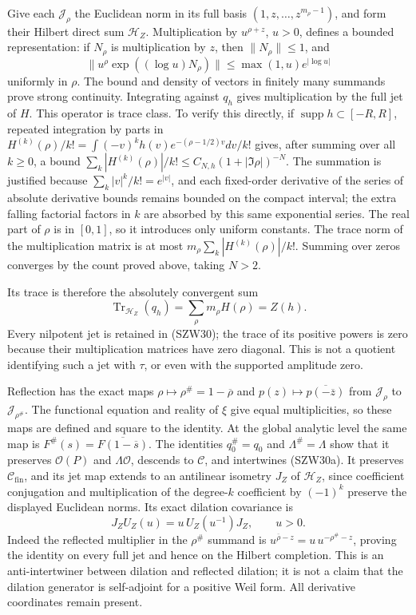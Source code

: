 \documentclass[
  10pt,
  a4paper,
]{article}
\begin{document}
Give each \(\mathcal J_\rho\) the Euclidean norm in its full basis
\((1,z,\ldots,z^{m_\rho-1})\), and form their Hilbert direct sum
\(\mathcal H_Z\). Multiplication by \(u^{\rho+z}\), \(u>0\), defines a
bounded representation: if \(N_\rho\) is multiplication by \(z\), then
\(\|N_\rho\|\le1\), and \[
\|u^\rho\exp((\log u)N_\rho)\|
\le\max(1,u)e^{|\log u|}
\tag{SZW31}
\] uniformly in \(\rho\). The bound and density of vectors in finitely
many summands prove strong continuity. Integrating against \(q_h\) gives
multiplication by the full jet of \(H\). This operator is trace class.
To verify this directly, if \(\operatorname{supp}h\subset[-R,R]\),
repeated integration by parts in
\(H^{(k)}(\rho)/k!=\int(-v)^kh(v)e^{-(\rho-1/2)v}dv/k!\) gives, after
summing over all \(k\ge0\), a bound
\(\sum_k|H^{(k)}(\rho)|/k!\le C_{N,h}(1+|\Im\rho|)^{-N}\). The summation
is justified because \(\sum_k|v|^k/k!=e^{|v|}\), and each fixed-order
derivative of the series of absolute derivative bounds remains bounded
on the compact interval; the extra falling factorial factors in \(k\)
are absorbed by this same exponential series. The real part of \(\rho\)
is in \([0,1]\), so it introduces only uniform constants. The trace norm
of the multiplication matrix is at most
\(m_\rho\sum_k|H^{(k)}(\rho)|/k!\). Summing over zeros converges by the
count proved above, taking \(N>2\).

Its trace is therefore the absolutely convergent sum \[
\operatorname{Tr}_{\mathcal H_Z}(q_h)=\sum_\rho m_\rho H(\rho)=Z(h).
\tag{SZW32}
\] Every nilpotent jet is retained in (SZW30); the trace of its positive
powers is zero because their multiplication matrices have zero diagonal.
This is not a quotient identifying such a jet with \(\tau\), or even
with the supported amplitude zero.

Reflection has the exact maps \(\rho\mapsto\rho^\#=1-\overline\rho\) and
\(p(z)\mapsto\overline{p(-\overline z)}\) from \(\mathcal J_\rho\) to
\(\mathcal J_{\rho^\#}\). The functional equation and reality of \(\xi\)
give equal multiplicities, so these maps are defined and square to the
identity. At the global analytic level the same map is
\(F^\#(s)=\overline{F(1-\overline s)}\). The identities \(q_0^\#=q_0\)
and \(\Lambda^\#=\Lambda\) show that it preserves \(\mathcal O(P)\) and
\(\Lambda\mathcal O\), descends to \(\mathcal C\), and intertwines
(SZW30a). It preserves \(\mathcal C_{\mathrm{fin}}\), and its jet map
extends to an antilinear isometry \(J_Z\) of \(\mathcal H_Z\), since
coefficient conjugation and multiplication of the degree-\(k\)
coefficient by \((-1)^k\) preserve the displayed Euclidean norms. Its
exact dilation covariance is \[
J_ZU_Z(u)=u\,U_Z(u^{-1})J_Z,
\qquad u>0.
\tag{SZW32a}
\] Indeed the reflected multiplier in the \(\rho^\#\) summand is
\(u^{\overline\rho-z}=u\,u^{-\rho^\#-z}\), proving the identity on every
full jet and hence on the Hilbert completion. This is an
anti-intertwiner between dilation and reflected dilation; it is not a
claim that the dilation generator is self-adjoint for a positive Weil
form. All derivative coordinates remain present.
\end{document}
